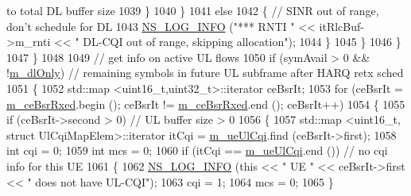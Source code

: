 \begin{DoxyCode}
{       to total DL buffer size}
1039                                         \}
1040                                 \}
1041                                 \textcolor{keywordflow}{else}
1042                                 \{ \textcolor{comment}{// SINR out of range, don't schedule for DL}
1043                                         \hyperlink{group__logging_gafbd73ee2cf9f26b319f49086d8e860fb}{NS\_LOG\_INFO} (\textcolor{stringliteral}{"*** RNTI "} << itRlcBuf->m\_rnti << \textcolor{stringliteral}{" DL-CQI
       out of range, skipping allocation"});
1044                                 \}
1045                         \}
1046                 \}
1047         \}
1048 
1049         \textcolor{comment}{// get info on active UL flows}
1050         \textcolor{keywordflow}{if} (symAvail > 0 && !\hyperlink{classns3_1_1MmWaveFlexTtiMacScheduler_a41cc41f208cd4be60b44da4668a75c7b}{m\_dlOnly})  \textcolor{comment}{// remaining symbols in future UL subframe after HARQ retx
       sched}
1051         \{
1052                 std::map <uint16\_t,uint32\_t>::iterator ceBsrIt;
1053                 \textcolor{keywordflow}{for} (ceBsrIt = \hyperlink{classns3_1_1MmWaveFlexTtiMacScheduler_a3f24f21e6b97c5f90be970f6f8b3bffa}{m\_ceBsrRxed}.begin (); ceBsrIt != 
      \hyperlink{classns3_1_1MmWaveFlexTtiMacScheduler_a3f24f21e6b97c5f90be970f6f8b3bffa}{m\_ceBsrRxed}.end (); ceBsrIt++)
1054                 \{
1055                         \textcolor{keywordflow}{if} (ceBsrIt->second > 0)  \textcolor{comment}{// UL buffer size > 0}
1056                         \{
1057                                 std::map <uint16\_t, struct UlCqiMapElem>::iterator itCqi = 
      \hyperlink{classns3_1_1MmWaveFlexTtiMacScheduler_a1b7ed5c8fa4442252efa7cc43318f463}{m\_ueUlCqi}.find (ceBsrIt->first);
1058                                 \textcolor{keywordtype}{int} cqi = 0;
1059                                 \textcolor{keywordtype}{int} mcs = 0;
1060                                 \textcolor{keywordflow}{if} (itCqi == \hyperlink{classns3_1_1MmWaveFlexTtiMacScheduler_a1b7ed5c8fa4442252efa7cc43318f463}{m\_ueUlCqi}.end ()) \textcolor{comment}{// no cqi info for this UE}
1061                                 \{
1062                                         \hyperlink{group__logging_gafbd73ee2cf9f26b319f49086d8e860fb}{NS\_LOG\_INFO} (\textcolor{keyword}{this} << \textcolor{stringliteral}{" UE "} << ceBsrIt->first << \textcolor{stringliteral}{" does
       not have UL-CQI"});
1063                                         cqi = 1;
1064                                         mcs = 0;
1065                                 \}

\end{DoxyCode}
